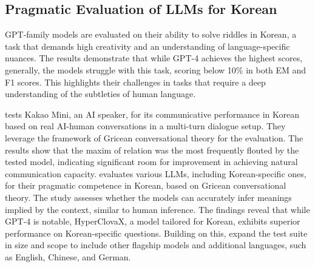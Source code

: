 \subsection*{Pragmatic Evaluation of LLMs for Korean}


\cite{eo} GPT-family models are evaluated on their ability to solve riddles in Korean, a task that demands high creativity and an understanding of language-specific nuances. The results demonstrate that while GPT-4 achieves the highest scores, generally, the models struggle with this task, scoring below 10\% in both EM and F1 scores. This highlights their challenges in tasks that require a deep understanding of the subtleties of human language.

\cite{nam} tests Kakao Mini, an AI speaker, for its communicative performance in Korean based on real AI-human conversations in a multi-turn dialogue setup. They leverage the framework of Gricean conversational theory for the evaluation. The results show that the maxim of relation was the most frequently flouted by the tested model, indicating significant room for improvement in achieving natural communication capacity. \cite{park1} evaluates various LLMs, including Korean-specific ones, for their pragmatic competence in Korean, based on Gricean conversational theory. The study assesses whether the models can accurately infer meanings implied by the context, similar to human inference. The findings reveal that while GPT-4 is notable, HyperClovaX, a model tailored for Korean, exhibits superior performance on Korean-specific questions. Building on this, \cite{park2} expand the test suite in size and scope to include other flagship models and additional languages, such as English, Chinese, and German.